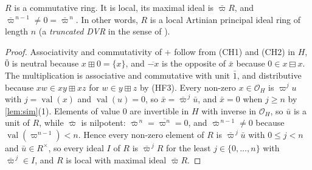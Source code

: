 \documentclass[11pt]{amsart}
\numberwithin{equation}{section}
\newcommand{\hplus}{\boxplus}
\newcommand{\hminus}{\boxminus}
\newcommand{\val}{\operatorname{val}}
\begin{document}
\begin{lemma}\label{lem:R}
$R$ is a commutative ring. It is local, its maximal ideal is $\bar\varpi R$, and $\bar\varpi^{\,n-1}\ne0=\bar\varpi^{\,n}$. In other words, $R$ is a local Artinian principal ideal ring of length $n$ (a \emph{truncated DVR} in the sense of \cite[Definition~1.8]{Tolliver16}).
\end{lemma}

\begin{proof}
Associativity and commutativity of $+$ follow from (CH1) and (CH2) in $H$, $\bar0$ is neutral because $x\hplus0=\{x\}$, and $\overline{-x}$ is the opposite of $\bar x$ because $0\in x\hminus x$. The multiplication is associative and commutative with unit $\bar1$, and distributive because $xw\in xy\hplus xz$ for $w\in y\hplus z$ by (HF3). Every non-zero $x\in\mathcal O_H$ is $\varpi^j u$ with $j=\val(x)$ and $\val(u)=0$, so $\bar x=\bar\varpi^{\,j}\bar u$, and $\bar x=0$ when $j\ge n$ by \cref{lem:sim}(1). Elements of value $0$ are invertible in $H$ with inverse in $\mathcal O_H$, so $\bar u$ is a unit of $R$, while $\bar\varpi$ is nilpotent: $\bar\varpi^{\,n}=\overline{\varpi^n}=0$, and $\bar\varpi^{\,n-1}\ne0$ because $\val(\varpi^{n-1})<n$. Hence every non-zero element of $R$ is $\bar\varpi^{\,j}\bar u$ with $0\le j<n$ and $\bar u\in R^\times$, so every ideal $I$ of $R$ is $\bar\varpi^{\,j}R$ for the least $j\in\{0,\dots,n\}$ with $\bar\varpi^{\,j}\in I$, and $R$ is local with maximal ideal $\bar\varpi R$.
\end{proof}
\end{document}
